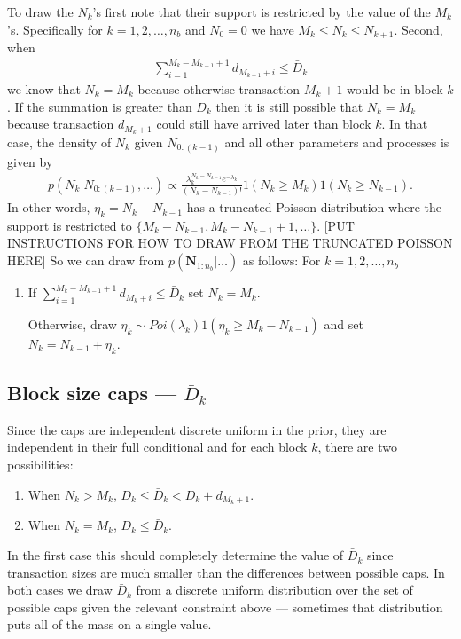 \documentclass{article}
\begin{document}
To draw the $N_k$'s first note that their support is restricted by the value of the $M_k$'s. Specifically for $k=1,2,\dots,n_b$ and $N_0 = 0$ we have $M_k \le N_k \le N_{k+1}$. Second, when 
\begin{align*}
\sum_{i=1}^{M_k - M_{k-1} + 1}d_{M_{k-1} + i} \le \bar{D}_k
\end{align*}
we know that $N_k = M_k$ because otherwise transaction $M_k + 1$ would be in block $k$. If the summation is greater than $D_k$ then it is still possible that $N_k = M_k$ because transaction $d_{M_k + 1}$ could still have arrived later than block $k$. In that case, the density of $N_k$ given $N_{0:(k-1)}$ and all other parameters and processes is given by
\begin{align*}
p(N_k|N_{0:(k-1)}, \dots) \propto \frac{\lambda_k^{N_k - N_{k-1}}e^{-\lambda_k}}{(N_k - N_{k-1})!}1(N_k \ge M_k)1(N_k \ge N_{k-1}).
\end{align*}
In other words, $\eta_k = N_k - N_{k-1}$ has a truncated Poisson distribution where the support is restricted to $\{M_k - N_{k-1}, M_k - N_{k-1} + 1, \dots \}$. [PUT INSTRUCTIONS FOR HOW TO DRAW FROM THE TRUNCATED POISSON HERE] So we can draw from $p(\bm{N}_{1:n_b}|\dots)$ as follows: For $k=1,2,\dots,n_b$
\begin{enumerate}
\item If $\sum_{i=1}^{M_k - M_{k-1} + 1} d_{M_k + i} \le \bar{D}_k$ set $N_k = M_k$.

Otherwise, draw $\eta_k \sim Poi(\lambda_k)1(\eta_k \ge M_k - N_{k-1})$ and set $N_k = N_{k-1} + \eta_k$.
\end{enumerate}
\subsection{Block size caps --- $\bar{D}_k$}
Since the caps are independent discrete uniform in the prior, they are independent in their full conditional and for each block $k$, there are two possibilities:
\begin{enumerate}
\item When $N_k > M_k$, $D_k \le \bar{D}_k < D_k + d_{M_k+1}$.
\item When $N_k = M_k$, $D_k \le \bar{D}_k$.
\end{enumerate}
In the first case this should completely determine the value of $\bar{D}_k$ since transaction sizes are much smaller than the differences between possible caps. In both cases we draw $\bar{D}_k$ from a discrete uniform distribution over the set of possible caps given the relevant constraint above --- sometimes that distribution puts all of the mass on a single value.
\end{document}
